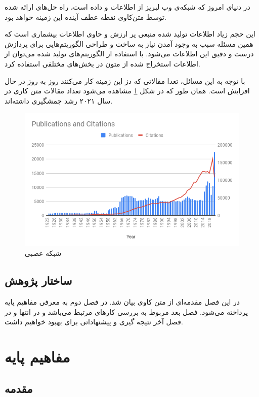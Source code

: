 \documentclass[12pt, a4paper, oneside]{report}
\begin{document}
در دنیای امروز که شبکه‌ی وب لبریز از اطلاعات و داده است، راه حل‌های ارائه شده توسط متن‌کاوی نقطه
عطف آینده این زمینه خواهد بود\cite{8844895}.


این حجم زیاد اطلاعات تولید شده منبعی پر ارزش و حاوی اطلاعات بیشماری است که همین مسئله سبب به وجود آمدن نیاز به
ساخت و طراحی الگوریتم‌هایی برای پردازش درست و دقیق این اطلاعات می‌شود. با استفاده از الگوریتم‌های تولید شده می‌توان از
اطلاعات استخراج شده از متون در بخش‌های مختلفی استفاده کرد\cite{DBLP:journals/corr/AllahyariPASTGK17a}.

با توجه به این مسائل، تعدا مقالاتی که دز این زمینه کار می‌کنند روز به روز در حال افزایش است. همان طور
که در شکل
\ref{fig:cites}
مشاهده می‌شود تعداد مقالات متن کاری در سال ۲۰۲۱ رشد چمشگیری داشته‌اند.

\begin{figure}[!ht]
    \centering
    \includegraphics[width=\textwidth]{cites}
    \caption{شبکه عصبی }
    \label{fig:cites}
\end{figure}

\section{ساختار پژوهش}

در این فصل مقدمه‌ای از متن کاوی بیان شد. در فصل دوم به معرفی مفاهیم پایه پرداخته می‌شود. فصل بعد
مربوط به بررسی کارهای مرتبط می‌باشد و در انتها و در فصل آخر نتیجه گیری و پیشنهاداتی برای بهبود خواهیم داشت.

\chapter{مفاهیم پایه}
\pagebreak
\section{مقدمه}
\end{document}

